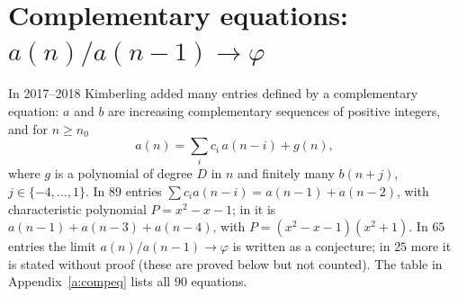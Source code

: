 \section{Complementary equations: \texorpdfstring{$a(n)/a(n-1)\to\varphi$}{a(n)/a(n-1) -> phi}}\label{s:compeq}
In 2017--2018 Kimberling added many entries defined by a complementary equation: $a$ and $b$ are increasing
complementary sequences of positive integers, and for $n\ge n_0$
\[ a(n)=\sum_ic_i\,a(n-i)+g(n), \]
where $g$ is a polynomial of degree $D$ in $n$ and finitely many $b(n+j)$, $j\in\{-4,\dots,1\}$. In $89$ entries
$\sum c_ia(n-i)=a(n-1)+a(n-2)$, with characteristic polynomial $P=x^2-x-1$; in  it is
$a(n-1)+a(n-3)+a(n-4)$, with $P=(x^2-x-1)(x^2+1)$. In $65$ entries the limit $a(n)/a(n-1)\to\varphi$ is written as a
conjecture; in $25$ more it is stated without proof (these are proved below but not counted). The table in
Appendix~\ref{a:compeq} lists all $90$ equations.

